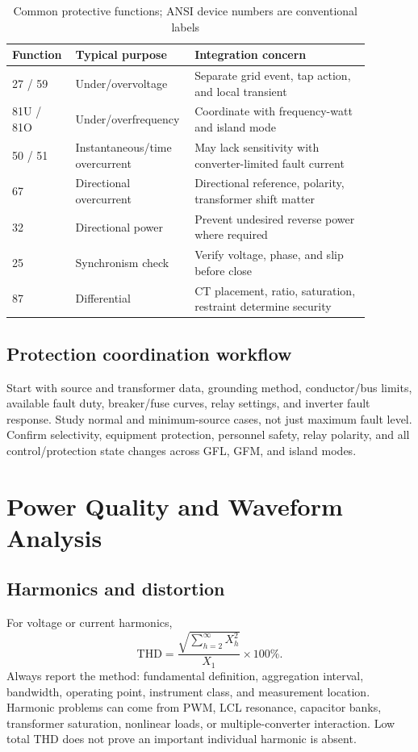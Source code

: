\documentclass[11pt]{article}
\begin{document}
\begin{table}[h]
\centering
\caption{Common protective functions; ANSI device numbers are conventional labels}
\begin{tabular}{p{0.16\linewidth}p{0.25\linewidth}p{0.47\linewidth}}
\toprule
Function & Typical purpose & Integration concern \\
\midrule
27 / 59 & Under/overvoltage & Separate grid event, tap action, and local transient \\
81U / 81O & Under/overfrequency & Coordinate with frequency-watt and island mode \\
50 / 51 & Instantaneous/time overcurrent & May lack sensitivity with converter-limited fault current \\
67 & Directional overcurrent & Directional reference, polarity, transformer shift matter \\
32 & Directional power & Prevent undesired reverse power where required \\
25 & Synchronism check & Verify voltage, phase, and slip before close \\
87 & Differential & CT placement, ratio, saturation, restraint determine security \\
\bottomrule
\end{tabular}
\end{table}

\subsection{Protection coordination workflow}
Start with source and transformer data, grounding method, conductor/bus limits,
available fault duty, breaker/fuse curves, relay settings, and inverter fault
response. Study normal and minimum-source cases, not just maximum fault level.
Confirm selectivity, equipment protection, personnel safety, relay polarity,
and all control/protection state changes across GFL, GFM, and island modes.

\section{Power Quality and Waveform Analysis}

\subsection{Harmonics and distortion}
For voltage or current harmonics,
\[
\mathrm{THD}=\frac{\sqrt{\sum_{h=2}^{\infty}X_h^2}}{X_1}\times100\%.
\]
Always report the method: fundamental definition, aggregation interval,
bandwidth, operating point, instrument class, and measurement location.
Harmonic problems can come from PWM, LCL resonance, capacitor banks,
transformer saturation, nonlinear loads, or multiple-converter interaction.
Low total THD does not prove an important individual harmonic is absent.
\end{document}
